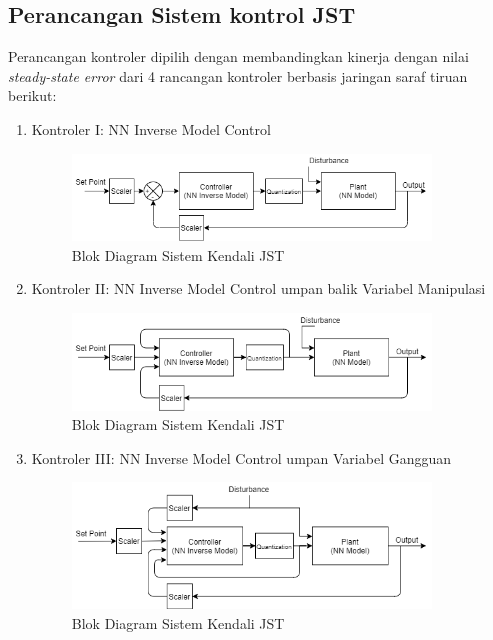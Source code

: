 \subsection{Perancangan Sistem kontrol JST}
Perancangan kontroler dipilih dengan membandingkan kinerja dengan nilai \textit{steady-state error} dari 4 rancangan kontroler berbasis jaringan saraf tiruan berikut:
\begin{enumerate}
	\item Kontroler I: NN Inverse Model Control
	\begin{figure}[!h]
		\centering
		\includegraphics[width=0.9\textwidth]{figures/ControlDesignDiagramI}
		\caption{Blok Diagram Sistem Kendali JST}
		\label{fig:4:ConstrolSystemBlockDiagramI}
	\end{figure}
	\vspace{-1em}
	
	\item Kontroler II: NN Inverse Model Control umpan balik Variabel Manipulasi
	\begin{figure}[!h]
		\centering
		\includegraphics[width=0.9\textwidth]{figures/ControlDesignDiagramII}
		\caption{Blok Diagram Sistem Kendali JST}
		\label{fig:4:ConstrolSystemBlockDiagramII}
	\end{figure}
	\vspace{-1em}
	
	\item Kontroler III: NN Inverse Model Control umpan Variabel Gangguan
	\begin{figure}[!h]
		\centering
		\includegraphics[width=0.9\textwidth]{figures/ControlDesignDiagramIII}
		\caption{Blok Diagram Sistem Kendali JST}
		\label{fig:4:ConstrolSystemBlockDiagramIII}
	\end{figure}
	\vspace{1em}
	

\end{enumerate}
